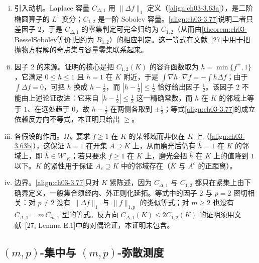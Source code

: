 \documentclass[../../main.tex]{subfiles}%
\begin{document}
\begin{remark}\label{remark:ch03-Laplacian动机}
\begin{enumerate}[(i)]
\item 引入动机。Laplace 容量 $C_{\Delta,1}$ 用 $\|\Delta f\|_1$ 定义（\eqref{align:ch03-3.63a}），是二阶椭圆算子的 $L^1$ 变分；$C_{1,2}$ 是一阶 Sobolev 容量。\eqref{align:ch03-3.77}说明二者只差因子 $2$，于是 $C_{\Delta,1}$ 的零集判定可完全归约为 $C_{1,2}$（从而由\cref{theorem:ch03-BesselSobolev等价}归约为 $B_{1,2}$）的相应判定。这一等式在文献~[27]中用于把抛物方程解的奇点集与容量零集联系起来。
\item 因子 2 的来源。证明的核心是把 $C_{1,2}(K)$ 的容许函数取为 $h=\min\{f^+,1\}$，它满足 $0\leqslant h\leqslant1$ 且 $h=1$ 在 $K$ 附近，于是 $\int\nabla h\cdot\nabla f=-\int h\Delta f$；由于 $\int\Delta f=0$，可把 $h$ 换成 $h-\frac12$，而 $|h-\frac12|\leqslant\frac12$ 恰好给出因子 $\frac12$。该因子 $2$ 不能由上述论证改进：它来自 $|h-\frac12|\leqslant\frac12$ 这一精确常数，而 $h$ 在 $K$ 的邻域上等于 $1$、在远处趋于 $0$，故 $h-\frac12$ 在两侧各取到 $\pm\frac12$；等式\eqref{align:ch03-3.77}的成立依赖反方向不等式，本证明只给出 $\geqslant$。
\item 各假设的作用。$\Omega_K$ 要求 $f\geqslant1$ 在 $K$ 的某邻域而非仅在 $K$ 上（\eqref{align:ch03-3.63b}），这保证 $h=1$ 在开集 $A\supseteq K$ 上，从而磨光后仍有 $\widehat h=1$ 在 $K$ 的邻域上，即 $\widehat h\in W'_K$；若只要求 $f\geqslant1$ 在 $K$ 上，磨光会把 $\widehat h$ 在 $K$ 上的值降到 $1$ 以下。$K$ 的紧性用于保证 $A_\varepsilon\supseteq K$ 中的邻域存在（$K$ 与 $A^c$ 的正距离）。
\item 边界。\eqref{align:ch03-3.77}只对 $K$ 紧陈述，因为 $C_{\Delta,1}$ 与 $C_{1,2}$ 都只在紧集上由下确界定义，一般集合须经内、外正则化延拓。等式中的因子 $2$ 与 $p=2$ 密切相关：对 $p\neq2$ 没有 $\|\Delta f\|_1$ 与 $\|f\|_{1,p}$ 的类似等式；对 $m\geqslant2$ 也没有 $C_{\Delta,1}=m\,C_{m,1}$ 型的等式。反方向 $C_{\Delta,1}(K)\leqslant2C_{1,2}(K)$ 的证明须用文献~[27, Lemma E.1]中的对偶论证，本证明未包含。
\end{enumerate}
\end{remark}

\subsection{$(m,p)$-集中与 $(m,p)$-弥散测度}\label{subsection:ch03-集中弥散}\label{subsection:ch03-集中分解}
\end{document}
